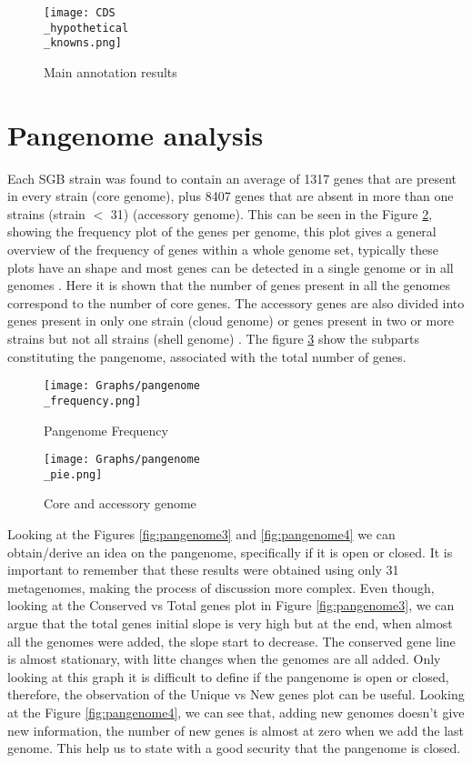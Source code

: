 \documentclass[a4paper,titlepage]{book}
\begin{document}
\begin{figure}[ht]
\centering
\texttt{[image: CDS\\\_hypothetical\\\_knowns.png]}
\caption{Main annotation results}
\label{fig:CDS}
\end{figure}

\section{Pangenome analysis}



Each SGB strain was found to contain an average of 1317 genes that are present in every strain (core genome), plus 8407 genes that are absent in more than one strains (strain $<$ 31) (accessory genome). This can be seen in the Figure \ref{fig:pangenome2}, showing the frequency plot of the genes per genome, this plot gives a general overview of the frequency of genes within a whole genome set, typically these plots have an shape and most genes can be detected in a single genome or in all genomes \cite{Analysis-roary}. Here it is shown that the number of genes present in all the genomes correspond to the number of core genes.
The accessory genes are also divided into genes present in only one strain (cloud genome) or genes present in two or more strains but not all strains (shell genome) \cite{Medini}. The figure \ref{fig:pangenome1} show the subparts constituting the pangenome, associated with the total number of genes.



\begin{figure}[ht]
\centering
\texttt{[image: Graphs/pangenome\\\_frequency.png]}
\caption{Pangenome Frequency}
\label{fig:pangenome2}
\end{figure}

\begin{figure}[ht]
\centering
\texttt{[image: Graphs/pangenome\\\_pie.png]}
\caption{Core and accessory genome}
\label{fig:pangenome1}
\end{figure}


Looking at the Figures \ref{fig:pangenome3} and  \ref{fig:pangenome4} we can obtain/derive an idea on the pangenome, specifically if it is open or closed. It is important to remember that these results were obtained using only 31 metagenomes, making the process of discussion more complex. Even though, looking at the Conserved vs Total genes plot in Figure \ref{fig:pangenome3}, we can argue that the total genes initial slope is very high but at the end, when almost all the genomes were added, the slope start to decrease. The conserved gene line is almost stationary, with litte changes when the genomes are all added. Only looking at this graph it is difficult to define if the pangenome is open or closed, therefore, the observation of the Unique vs New genes plot can be useful. Looking at the Figure \ref{fig:pangenome4}, we can see that, adding new genomes doesn't give new information, the number of new genes is almost at zero when we add the last genome. This help us to state with a good security that the pangenome is closed.
\end{document}
